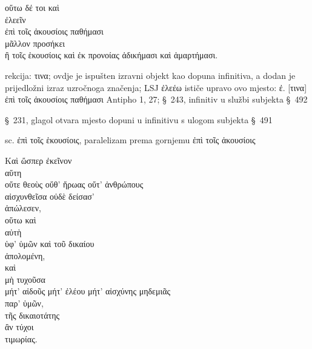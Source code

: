 
{\large
\begin{greek}
\noindent οὕτω δέ τοι καὶ \\
\tabto{2em} ἐλεεῖν \\
\tabto{4em} ἐπὶ τοῖς ἀκουσίοις παθήμασι \\
μᾶλλον προσήκει\\
\tabto{2em} ἢ τοῖς ἑκουσίοις καὶ ἐκ προνοίας ἀδικήμασι καὶ ἁμαρτήμασι.\\

\end{greek}
}

\begin{description}[noitemsep,topsep=0pt]
\item[ἐλεεῖν] rekcija: τινα; ovdje je ispušten izravni objekt kao dopuna infinitiva, a dodan je prijedložni izraz uzročnoga značenja; LSJ ἐλεέω ističe upravo ovo mjesto: ἐ. [τινα] ἐπὶ τοῖς ἀκουσίοις παθήμασι Antipho 1, 27; §~243, infinitiv u službi subjekta §~492
\item[προσήκει] §~231, glagol otvara mjesto dopuni u infinitivu s ulogom subjekta §~491
\item[τοῖς ἑκουσίοις] sc. ἐπὶ τοῖς ἑκουσίοις, paralelizam prema gornjemu ἐπὶ τοῖς ἀκουσίοις
\end{description}


{\large
\begin{greek}
\noindent Καὶ ὥσπερ ἐκεῖνον \\
αὕτη \\
\tabto{4em} οὔτε θεοὺς οὔθ' ἥρωας οὔτ' ἀνθρώπους \\
\tabto{2em} αἰσχυνθεῖσα οὐδὲ δείσασ' \\

ἀπώλεσεν, \\
οὕτω καὶ \\
αὐτὴ \\
\tabto{4em} ὑφ' ὑμῶν καὶ τοῦ δικαίου \\
\tabto{2em} ἀπολομένη, \\
καὶ \\
μὴ τυχοῦσα \\
\tabto{2em} μήτ' αἰδοῦς μήτ' ἐλέου μήτ' αἰσχύνης μηδεμιᾶς \\
\tabto{4em} παρ' ὑμῶν, \\
τῆς δικαιοτάτης \\
\tabto{2em} ἂν τύχοι \\
τιμωρίας.\\

\end{greek}
}

